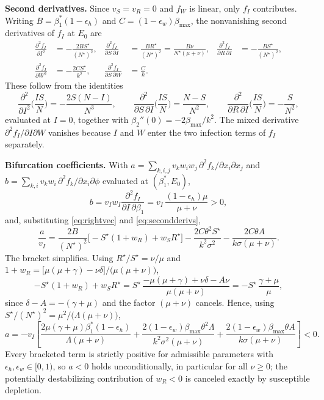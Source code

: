 \documentclass[11pt]{article}
\theoremstyle{plain}
\theoremstyle{definition}
\theoremstyle{remark}
\begin{document}
\textbf{Second derivatives.} Since $v_S=v_R=0$ and $f_W$ is linear, only $f_I$ contributes. Writing $B=\beta_1^*(1-\epsilon_h)$ and $C=(1-\epsilon_w)\beta_{\max}$, the nonvanishing second derivatives of $f_I$ at $E_0$ are
\begin{equation}\label{eq:secondderivs}
\begin{aligned}
\frac{\partial^2f_I}{\partial I^2}&=-\frac{2BS^\star}{(N^\star)^2}, &
\frac{\partial^2f_I}{\partial S\,\partial I}&=\frac{BR^\star}{(N^\star)^2}=\frac{B\nu}{N^\star(\mu+\nu)}, &
\frac{\partial^2f_I}{\partial R\,\partial I}&=-\frac{BS^\star}{(N^\star)^2},\\[2pt]
\frac{\partial^2f_I}{\partial W^2}&=-\frac{2CS^\star}{k^2}, &
\frac{\partial^2f_I}{\partial S\,\partial W}&=\frac{C}{k}. & &
\end{aligned}
\end{equation}
These follow from the identities
\[
\frac{\partial^2}{\partial I^2}\Big(\frac{IS}{N}\Big)=-\frac{2S(N-I)}{N^3},\qquad
\frac{\partial^2}{\partial S\,\partial I}\Big(\frac{IS}{N}\Big)=\frac{N-S}{N^2},\qquad
\frac{\partial^2}{\partial R\,\partial I}\Big(\frac{IS}{N}\Big)=-\frac{S}{N^2},
\]
evaluated at $I=0$, together with $\beta_2''(0)=-2\beta_{\max}/k^2$. The mixed derivative $\partial^2f_I/\partial I\partial W$ vanishes because $I$ and $W$ enter the two infection terms of $f_I$ separately.

\textbf{Bifurcation coefficients.} With $a=\sum_{k,i,j}v_kw_iw_j\,\partial^2f_k/\partial x_i\partial x_j$ and $b=\sum_{k,i}v_kw_i\,\partial^2f_k/\partial x_i\partial\phi$ evaluated at $(\beta_1^*,E_0)$,
\begin{equation}\label{eq:bcoef}
b=v_Iw_I\frac{\partial^2f_I}{\partial I\,\partial\beta_1}=v_I\,\frac{(1-\epsilon_h)\mu}{\mu+\nu}>0 ,
\end{equation}
and, substituting \eqref{eq:rightvec} and \eqref{eq:secondderivs},
\[
\frac{a}{v_I}=\frac{2B}{(N^\star)^2}\Big[-S^\star(1+w_R)+w_SR^\star\Big]
-\frac{2C\theta^2S^\star}{k^2\sigma^2}-\frac{2C\theta A}{k\sigma(\mu+\nu)} .
\]
The bracket simplifies. Using $R^\star/S^\star=\nu/\mu$ and $1+w_R=\big[\mu(\mu+\gamma)-\nu\delta\big]/\big(\mu(\mu+\nu)\big)$,
\[
-S^\star(1+w_R)+w_SR^\star
=S^\star\,\frac{-\mu(\mu+\gamma)+\nu\delta-A\nu}{\mu(\mu+\nu)}
=-S^\star\,\frac{\gamma+\mu}{\mu},
\]
since $\delta-A=-(\gamma+\mu)$ and the factor $(\mu+\nu)$ cancels. Hence, using $S^\star/(N^\star)^2=\mu^2/\big(\Lambda(\mu+\nu)\big)$,
\begin{equation}\label{eq:acoef}
a=-v_I\left[\frac{2\mu(\gamma+\mu)\beta_1^*(1-\epsilon_h)}{\Lambda(\mu+\nu)}
+\frac{2(1-\epsilon_w)\beta_{\max}\theta^2\Lambda}{k^2\sigma^2(\mu+\nu)}
+\frac{2(1-\epsilon_w)\beta_{\max}\theta A}{k\sigma(\mu+\nu)}\right]<0 .
\end{equation}
Every bracketed term is strictly positive for admissible parameters with $\epsilon_h,\epsilon_w\in[0,1)$, so $a<0$ holds unconditionally, in particular for all $\nu\ge0$; the potentially destabilizing contribution of $w_R<0$ is canceled exactly by susceptible depletion.
\end{document}
